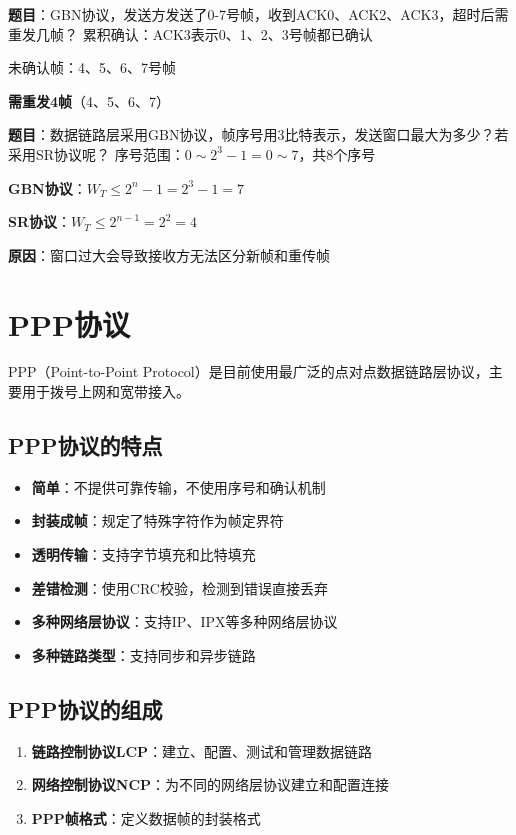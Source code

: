 \documentclass[12pt,a4paper,openany]{ctexbook}
\begin{document}
\begin{examplebox}[例题3.3 GBN协议]
\textbf{题目}：GBN协议，发送方发送了0-7号帧，收到ACK0、ACK2、ACK3，超时后需重发几帧？
\tcblower
累积确认：ACK3表示0、1、2、3号帧都已确认

未确认帧：4、5、6、7号帧

\textbf{需重发4帧}（4、5、6、7）
\end{examplebox}

\begin{examplebox}[例题3.3b 窗口大小计算]
\textbf{题目}：数据链路层采用GBN协议，帧序号用3比特表示，发送窗口最大为多少？若采用SR协议呢？
\tcblower
序号范围：$0 \sim 2^3 - 1 = 0 \sim 7$，共8个序号

\textbf{GBN协议}：$W_T \leq 2^n - 1 = 2^3 - 1 = 7$

\textbf{SR协议}：$W_T \leq 2^{n-1} = 2^2 = 4$

\textbf{原因}：窗口过大会导致接收方无法区分新帧和重传帧
\end{examplebox}


\section{PPP协议}
PPP（Point-to-Point Protocol）是目前使用最广泛的点对点数据链路层协议，主要用于拨号上网和宽带接入。

\subsection{PPP协议的特点}
\begin{itemize}[leftmargin=2em,itemsep=0pt]
    \item \textbf{简单}：不提供可靠传输，不使用序号和确认机制
    \item \textbf{封装成帧}：规定了特殊字符作为帧定界符
    \item \textbf{透明传输}：支持字节填充和比特填充
    \item \textbf{差错检测}：使用CRC校验，检测到错误直接丢弃
    \item \textbf{多种网络层协议}：支持IP、IPX等多种网络层协议
    \item \textbf{多种链路类型}：支持同步和异步链路
\end{itemize}

\subsection{PPP协议的组成}
\begin{enumerate}[leftmargin=2em,itemsep=0pt]
    \item \textbf{链路控制协议LCP}：建立、配置、测试和管理数据链路
    \item \textbf{网络控制协议NCP}：为不同的网络层协议建立和配置连接
    \item \textbf{PPP帧格式}：定义数据帧的封装格式
\end{enumerate}
\end{document}

